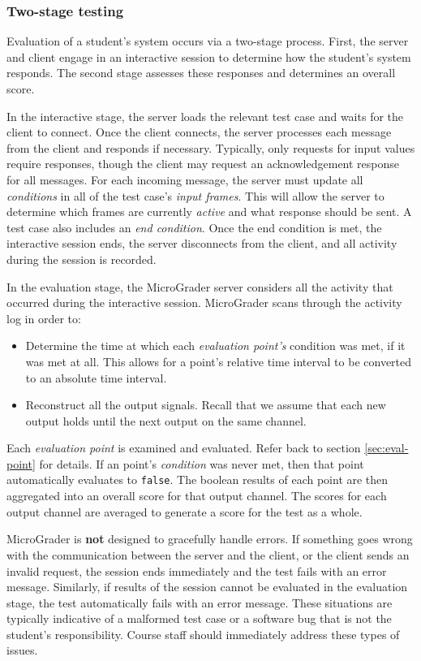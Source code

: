 \documentclass[12pt]{article}
\begin{document}
\subsubsection{Two-stage testing}
Evaluation of a student's system occurs via a two-stage process.  First, the server and client engage in an interactive session to determine how the student's system responds.  The second stage assesses these responses and determines an overall score.

In the interactive stage, the server loads the relevant test case and waits for the client to connect.  Once the client connects, the server processes each message from the client and responds if necessary.  Typically, only requests for input values require responses, though the client may request an acknowledgement response for all messages.  For each incoming message, the server must update all \textit{conditions} in all of the test case's \textit{input frames}.  This will allow the server to determine which frames are currently \textit{active} and what response should be sent.  A test case also includes an \textit{end condition}.  Once the end condition is met, the interactive session ends, the server disconnects from the client, and all activity during the session is recorded.

In the evaluation stage, the MicroGrader server considers all the activity that occurred during the interactive session.  MicroGrader scans through the activity log in order to:

\begin{itemize}
\item Determine the time at which each \textit{evaluation point's} condition was met, if it was met at all.  This allows for a point's relative time interval to be converted to an absolute time interval.
\item Reconstruct all the output signals.  Recall that we assume that each new output holds until the next output on the same channel.
\end{itemize}
Each \textit{evaluation point} is examined and evaluated.  Refer back to section \ref{sec:eval-point} for details.  If an point's \textit{condition} was never met, then that point automatically evaluates to \texttt{false}.  The boolean results of each point are then aggregated into an overall score for that output channel.  The scores for each output channel are averaged to generate a score for the test as a whole.

MicroGrader is \textbf{not} designed to gracefully handle errors.  If something goes wrong with the communication between the server and the client, or the client sends an invalid request, the session ends immediately and the test fails with an error message.  Similarly, if results of the session cannot be evaluated in the evaluation stage, the test automatically fails with an error message.  These situations are typically indicative of a malformed test case or a software bug that is not the student's responsibility.  Course staff should immediately address these types of issues.
\end{document}
